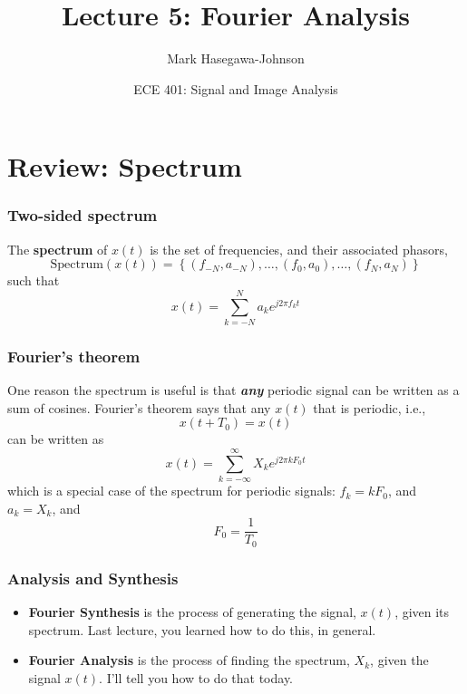 \documentclass{beamer}
\title{Lecture 5: Fourier Analysis}
\author{Mark Hasegawa-Johnson}
\date{ECE 401: Signal and Image Analysis}
\begin{document}
\begin{frame}
  \maketitle
\end{frame}

\begin{frame}
  \tableofcontents
\end{frame}

\section[Review]{Review: Spectrum}
\setcounter{subsection}{1}

\begin{frame}
  \frametitle{Two-sided spectrum}

  The {\bf spectrum} of $x(t)$ is the set of frequencies, and their
  associated phasors,
  \[
  \mbox{Spectrum}\left( x(t) \right) =
  \left\{ (f_{-N},a_{-N}), \ldots, (f_0,a_0), \ldots, (f_N,a_N) \right\}
  \]
  such that
  \[
  x(t) = \sum_{k=-N}^N a_ke^{j2\pi f_kt}
  \]
\end{frame}

\begin{frame}
  \frametitle{Fourier's theorem}

  One reason the spectrum is useful is that {\bf\em any} periodic
  signal can be written as a sum of cosines.  Fourier's theorem says that
  any $x(t)$ that is periodic, i.e.,
  \[
  x(t+T_0) = x(t)
  \]
  can be written as
  \[
  x(t) = \sum_{k=-\infty}^\infty X_k e^{j2\pi k F_0 t}
  \]
  which is a special case of the spectrum for periodic signals:
  $f_k=kF_0$, and $a_k=X_k$, and
  \[
  F_0 = \frac{1}{T_0}
  \]
\end{frame}

\begin{frame}
  \frametitle{Analysis and Synthesis}

  \begin{itemize}
  \item {\bf Fourier Synthesis} is the process of generating the
    signal, $x(t)$, given its spectrum.  Last lecture, you learned
    how to do this, in general.
  \item {\bf Fourier Analysis} is the process of finding the spectrum,
    $X_k$, given the signal $x(t)$.  I'll tell you how to do that today.
  \end{itemize}
\end{frame}
\end{document}
